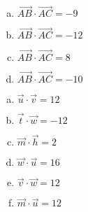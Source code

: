 \documentclass[12pt, a4paper]{article}
\begin{document}
\begin{Exercise}[number={50}]
    \begin{enumerate}[a)]
        \item $\overrightarrow{AB}\cdot\overrightarrow{AC}=-9$
        \item $\overrightarrow{AB}\cdot\overrightarrow{AC}=-12$
        \item $\overrightarrow{AB}\cdot\overrightarrow{AC}=8$
        \item $\overrightarrow{AB}\cdot\overrightarrow{AC}=-10$
    \end{enumerate}
\end{Exercise}

\begin{Exercise}[number={51}]
    \begin{enumerate}[a)]
        \item $\vec{u}\cdot\vec{v}=12$
        \item $\vec{t}\cdot\vec{w}=-12$
        \item $\vec{m}\cdot\vec{h}=2$
        \item $\vec{w}\cdot\vec{u}=16$
        \item $\vec{v}\cdot\vec{w}=12$
        \item $\vec{m}\cdot\vec{u}=12$
    \end{enumerate}
\end{Exercise}
\end{document}
